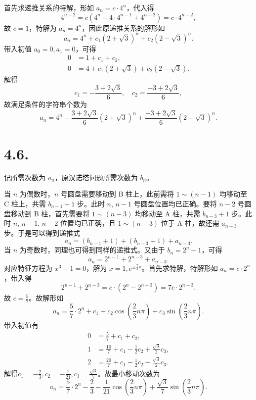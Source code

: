 \documentclass{article}
\begin{document}
首先求递推关系的特解，形如 $a_n=c\cdot 4^n$，代入得
\begin{equation}
    4^{n-2}=c(4^n-4\cdot 4^{n-1}+4^{n-2})=c\cdot 4^{n-2},
\end{equation}
故 $c=1$，特解为 $a_n=4^n$，因此原递推关系的解形如
\begin{equation}
    a_n=4^n+c_1(2+\sqrt 3)^n+c_2(2-\sqrt 3)^n.
\end{equation}
带入初值 $a_0=0,a_1=0$，可得
\begin{align}
    0&=1+c_1+c_2, \\
    0&=4 + c_1(2+\sqrt 3)+ c_2(2-\sqrt 3).
\end{align}
解得
\begin{equation}
    c_1=-\frac{3+2\sqrt 3}{6},\quad c_2=\frac{-3+2\sqrt 3}{6},
\end{equation}
故满足条件的字符串个数为
\begin{equation}
    a_n=4^n-\frac{3+2\sqrt 3}{6}(2+\sqrt 3)^n+\frac{-3+2\sqrt 3}{6}(2-\sqrt 3)^n.
\end{equation}

\section*{4.6.}
记所需次数为 $a_n$，原汉诺塔问题所需次数为 $b_n$。

当 $n$ 为偶数时，$n$ 号圆盘需要移动到 B 柱上，此前需将 $1\sim (n-1)$ 均移动至 C 柱上，共需 $b_{n-1}+1$ 步。此时 $n$, $n-1$ 号圆盘位置均已正确。要将 $n-2$ 号圆盘移动到 B 柱，首先需要将 $1\sim (n-3)$ 均移动至 A 柱，共需 $b_{n-3}+1$ 步。此时 $n$, $n-1$, $n-2$ 位置均已正确，且 $1\sim (n-3)$ 位于 A 柱，故还需 $a_{n-3}$ 步。于是可以得到递推式
\begin{equation}
    a_n=(b_{n-1}+1)+(b_{n-3}+1)+a_{n-3}.
\end{equation}
当 $n$ 为奇数时，同理也可得到同样的递推式。又由于 $b_n=2^n-1$，可得
\begin{equation}
    a_n=2^{n-1}+2^{n-3}+a_{n-3}.
\end{equation}
对应特征方程为 $x^3-1=0$，解为 $x=1,e^{\pm\frac 23\pi}$。首先求特解，特解形如 $a_n=c\cdot 2^n$，带入得
\begin{equation}
    2^{n-1}+2^{n-3}=c\cdot(2^n-2^{n-3})=7c\cdot 2^{n-3}.
\end{equation}
故 $c=\frac 57$。故解形如
\begin{equation}
    a_n=\frac 57\cdot 2^n+c_1+c_2\cos(\frac 23n\pi)+c_3\sin(\frac 23n\pi).
\end{equation}
带入初值有
\begin{align}
    0&=\frac 57+c_1+c_2, \\
    1&=\frac{10}7+c_1-\frac{1}{2}c_2+\frac{\sqrt 3}2c_3, \\
    2&=\frac{20}7+c_1-\frac 12c_2-\frac{\sqrt 3}2c_3.
\end{align}
解得$c_1=-\frac{2}{3},c_2=-\frac{1}{21},c_3=\frac{\sqrt 3}7$。故最小移动次数为
\begin{equation}
    a_n=\frac 57\cdot 2^n-\frac 23-\frac 1{21}\cos(\frac 23n\pi)+\frac{\sqrt 3}7\sin(\frac 23n\pi).
\end{equation}
\end{document}

